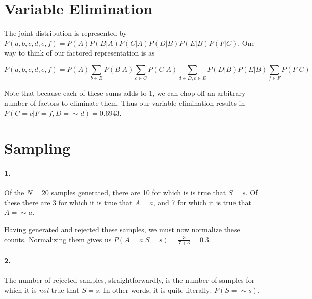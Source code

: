 \documentclass[11pt]{article}
\begin{document}
\section{Variable Elimination}

The joint distribution is represented by $P(a,b,c,d,e,f) = P(A)P(B|A)P(C|A)P(D|B)P(E|B)P(F|C)$. One way to think of our factored representation is as

\begin{equation}
P(a,b,c,d,e,f) = P(A) \sum_{b \in B} P(B|A) \sum_{c \in C} P(C|A) \sum_{d \in D, e \in E} P(D|B)P(E|B) \sum_{f \in F} P(F|C)
\end{equation}

Note that because each of these sums adds to 1, we can chop off an arbitrary number of factors to eliminate them. Thus our variable elimination results in $P(C=c | F=f, D= \sim d) = 0.6943$.



\section{Sampling}

\paragraph{1.} Of the $N = 20$ samples generated, there are 10 for which is is true that $S = s$. Of these there are 3 for which it is true that $A = a$, and 7 for which it is true that $A = \sim a$.

Having generated and rejected these samples, we must now normalize these counts. Normalizing them gives us $P(A=a|S=s) = \frac{3}{7+3} = 0.3$.

\paragraph{2.} The number of rejected samples, straightforwardly, is the number of samples for which it is \textit{not} true that $S = s$. In other words, it is quite literally: $P(S= \sim s)$.
\end{document}
